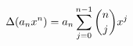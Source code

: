 \documentclass[preview]{standalone}
\begin{document}
\begin{align*}
\special{dvisvgm:raw <g id='unique000'>}\Delta(a_nx^n)=a_n\sum_{j=0}^{n-1}\binom nj x^j\special{dvisvgm:raw </g>}
\end{align*}
\end{document}
